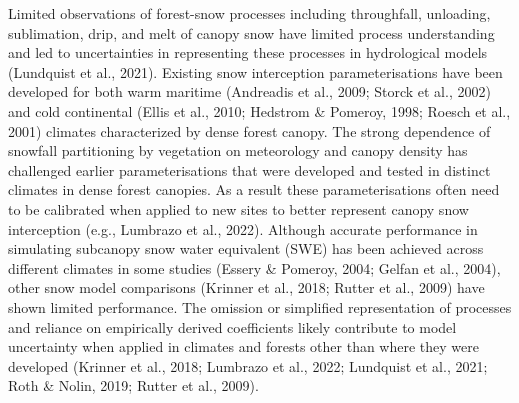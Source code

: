 \documentclass[
  letterpaper,
]{tex/uofsthesis-cs}
\begin{document}
Limited observations of forest-snow processes including throughfall,
unloading, sublimation, drip, and melt of canopy snow have limited
process understanding and led to uncertainties in representing these
processes in hydrological models (Lundquist et al., 2021). Existing snow
interception parameterisations have been developed for both warm
maritime (Andreadis et al., 2009; Storck et al., 2002) and cold
continental (Ellis et al., 2010; Hedstrom \& Pomeroy, 1998; Roesch et
al., 2001) climates characterized by dense forest canopy. The strong
dependence of snowfall partitioning by vegetation on meteorology and
canopy density has challenged earlier parameterisations that were
developed and tested in distinct climates in dense forest canopies. As a
result these parameterisations often need to be calibrated when applied
to new sites to better represent canopy snow interception (e.g.,
Lumbrazo et al., 2022). Although accurate performance in simulating
subcanopy snow water equivalent (SWE) has been achieved across different
climates in some studies (Essery \& Pomeroy, 2004; Gelfan et al., 2004),
other snow model comparisons (Krinner et al., 2018; Rutter et al., 2009)
have shown limited performance. The omission or simplified
representation of processes and reliance on empirically derived
coefficients likely contribute to model uncertainty when applied in
climates and forests other than where they were developed (Krinner et
al., 2018; Lumbrazo et al., 2022; Lundquist et al., 2021; Roth \& Nolin,
2019; Rutter et al., 2009).
\end{document}
